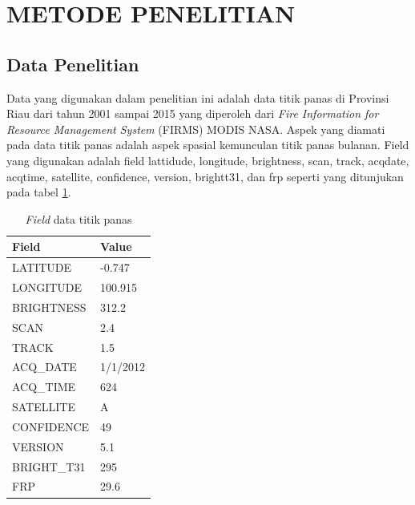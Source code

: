\section*{METODE PENELITIAN}
\subsection*{Data Penelitian}
Data yang digunakan dalam penelitian ini adalah data titik panas di Provinsi Riau dari tahun 2001 sampai 2015 yang diperoleh dari \textit{Fire Information for Resource Management System} (FIRMS) MODIS NASA. Aspek yang diamati pada data titik panas adalah aspek spasial kemunculan titik panas bulanan. Field  yang digunakan adalah field lattidude, longitude, brightness, scan, track, acqdate, acqtime, satellite, confidence, version, brightt31, dan frp  seperti yang ditunjukan pada tabel \ref*{titikpanas}.

\begin{table}[h]
	\centering
	\caption{\textit{Field} data titik panas}
	\label{titikpanas}
	\begin{tabular}{@{}ll@{}}
		\toprule
		Field       & Value    \\ \midrule
		LATITUDE    & -0.747   \\
		LONGITUDE   & 100.915  \\
		BRIGHTNESS  & 312.2    \\
		SCAN        & 2.4      \\
		TRACK       & 1.5      \\
		ACQ\_DATE   & 1/1/2012 \\
		ACQ\_TIME   & 624      \\
		SATELLITE   & A        \\
		CONFIDENCE  & 49       \\
		VERSION     & 5.1      \\
		BRIGHT\_T31 & 295      \\
		FRP         & 29.6     \\ \bottomrule
	\end{tabular}
\end{table}

